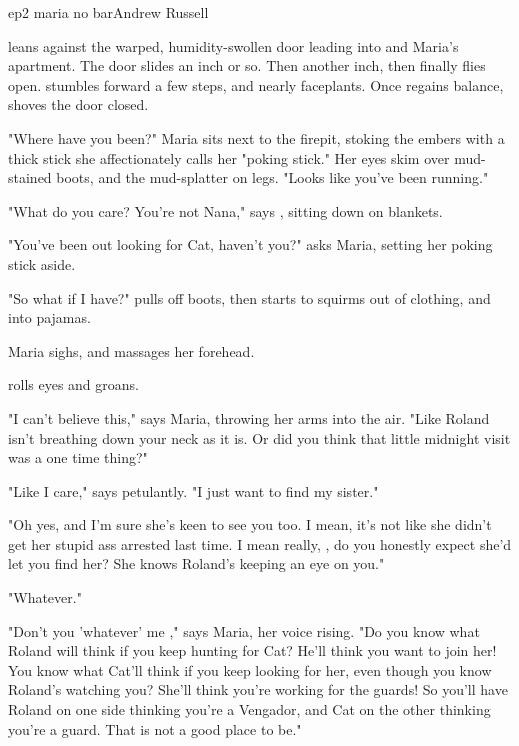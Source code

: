 \documentclass{book}
\begin{document}
\begin{childnode}{ep2 maria no bar}{Andrew Russell}

    \name{} leans against the warped, humidity-swollen door leading into \hisher{} and Maria's apartment. The door slides an inch or so. Then another inch, then finally flies open. \name{} stumbles forward a few steps, and nearly faceplants. Once \heshe{}
    regains \hisher{} balance, \heshe{} shoves the door closed. 

    "Where have you been?" Maria sits next to the firepit, stoking the embers with a thick stick she affectionately calls her "poking stick." Her eyes skim over \names{} mud-stained boots, and the mud-splatter on \hisher{} legs. "Looks like you've been running."

    "What do you care? You're not Nana," says \name{}, sitting down on \hisher{} blankets.

    "You've been out looking for Cat, haven't you?" asks Maria, setting her poking stick aside.

    "So what if I have?" \name{} pulls off \hisher{} boots, then starts to squirms out of \hisher{} clothing, and into \hisher{} pajamas.

    Maria sighs, and massages her forehead.

    \name{} rolls \hisher{} eyes and groans.

    "I can't believe this," says Maria, throwing her arms into the air. "Like Roland isn't breathing down your neck as it is. Or did you think that little midnight visit was a one time thing?"

    "Like I care," says \name{} petulantly. "I just want to find my sister."

    "Oh yes, and I'm sure she's keen to see you too. I mean, it's not like she didn't get her stupid ass arrested last time. I mean really, \name{}, do you honestly expect she'd let you find 
    her? She knows Roland's keeping an eye on you."

    "Whatever."

    "Don't you 'whatever' me \boygirl{}," says Maria, her voice rising. "Do you know what Roland will think if you keep hunting for Cat? He'll think you want to join her! You know what
    Cat'll think if you keep looking for her, even though you know Roland's watching you? She'll think you're working for the guards! So you'll have Roland on one side thinking you're a Vengador,
    and Cat on the other thinking you're a guard. That is not a good place to be."


\end{childnode}
\end{document}

